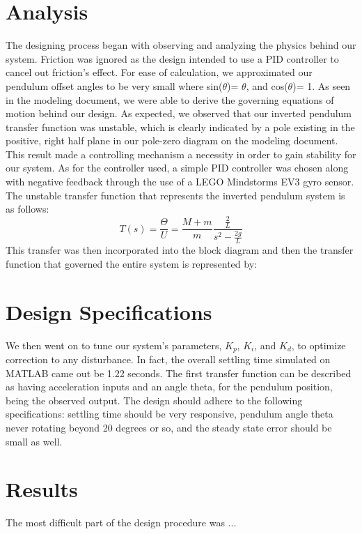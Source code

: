 \documentclass{notes}
\begin{document}
\section{Analysis}  
The designing process began with observing and analyzing the physics behind our system. Friction was ignored as the design intended to use a PID controller to cancel out friction's effect. For ease of calculation, we approximated our pendulum offset angles to be very small where sin($\theta$)= $\theta$, and cos($\theta$)= 1. As seen in the modeling document, we were able to derive the governing equations of motion behind our design. As expected, we observed that our inverted pendulum transfer function was unstable, which is clearly indicated by a pole existing in the positive, right half plane in our pole-zero diagram on the modeling document. This result made a controlling mechanism a necessity in order to gain stability for our system. As for the controller used, a simple PID controller was chosen along with negative feedback through the use of a LEGO Mindstorms EV3 gyro sensor. The unstable transfer function that represents the inverted pendulum system is as follows:
\[
  T(s) = \dfrac{\Theta}{U} = \dfrac{M+m}{m}\dfrac{\frac{2}{L}}{s^2-\frac{2g}{L}}
\]
This  transfer was then incorporated into the block diagram and then the transfer function that governed the entire system is represented by:

\section{Design Specifications}
We then went on to tune our system's parameters, $K_p$, $K_i$, and $K_d$, to optimize correction to any disturbance. In fact, the overall settling time simulated on MATLAB came out be 1.22 seconds. 
The first transfer function can be described as having acceleration inputs and an angle theta, for the pendulum position, being the observed output. The design should adhere to the following specifications: settling time should be very responsive, pendulum angle theta never rotating beyond 20 degrees or so, and the steady state error should be small as well.  

 \section{Results}
The most difficult part of the design procedure was ... 
   
\end{document}
